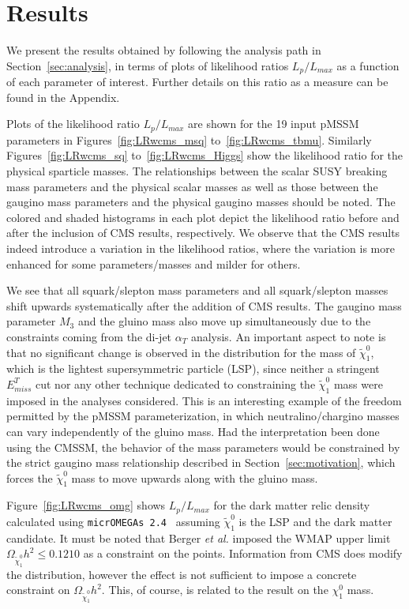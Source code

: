 \section{Results}
\label{sec:results}

We present the results obtained by following the analysis path in Section~\ref{sec:analysis}, in terms of  plots of likelihood ratios $L_p / L_{max}$ as a function of each parameter of interest.  Further details on this ratio as a  measure can be found in the Appendix.  

Plots of the likelihood ratio $L_p/L_{max}$ are shown for the 19 input pMSSM parameters in Figures~\ref{fig:LRwcms_msq} to~\ref{fig:LRwcms_tbmu}.  Similarly Figures~\ref{fig:LRwcms_sq} to~\ref{fig:LRwcms_Higgs} show the likelihood ratio for the physical sparticle masses.  The relationships between the scalar SUSY breaking mass parameters and the physical scalar masses as well as those between the gaugino mass parameters and the physical gaugino masses should be noted.  The colored and shaded histograms in each plot depict the likelihood ratio before and after the inclusion of CMS results, respectively.  We observe that the CMS results indeed introduce a variation in the likelihood ratios, where the variation is more enhanced for some parameters/masses and milder for others.  

We see that all squark/slepton mass parameters and all squark/slepton masses shift upwards systematically after the addition of CMS results.  The gaugino mass parameter $M_3$ and the gluino mass also move up simultaneously due to the constraints coming from the di-jet $\alpha_T$ analysis.  An important aspect to note is that no significant change is observed in the distribution for the mass of $\tilde{\chi}^0_1$, which is the lightest supersymmetric particle (LSP), since neither a stringent $E^T_{miss}$ cut nor any other technique dedicated to constraining the $\tilde{\chi}^0_1$ mass were imposed in the analyses considered.  This is an interesting example of
the freedom permitted by the pMSSM parameterization, in which neutralino/chargino masses can vary independently of the gluino mass.  Had the interpretation been done using 
the CMSSM, the behavior of the mass parameters would be constrained by the strict gaugino mass relationship described in Section~\ref{sec:motivation}, which forces the $\tilde{\chi}^0_1$ mass to move upwards along with the gluino mass.

Figure~\ref{fig:LRwcms_omg} shows $L_p/L_{max}$ for the dark matter relic density calculated using {\tt micrOMEGAs 2.4}~\cite{Belanger:2006is} assuming $\tilde{\chi}^0_1$ is the LSP and the dark matter candidate.  It must be noted that Berger {\it et al.} imposed the WMAP upper limit $\Omega_{\tilde{\chi}^0_1}h^2 \le 0.1210$ as a constraint on the points.  Information from CMS does modify the distribution, however the effect is not sufficient to impose a concrete constraint on $\Omega_{\tilde{\chi}^0_1}h^2$.  This, of course, is related to the result on the $\chi^0_1$ mass.

